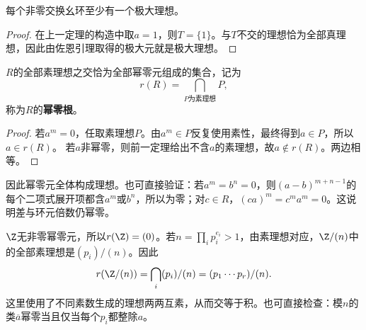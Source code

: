 \begin{corollary}
每个非零交换幺环至少有一个极大理想。
\end{corollary}
\begin{proof}
在上一定理的构造中取$a=1$，则$T=\{1\}$。与$T$不交的理想恰为全部真理想，因此由佐恩引理取得的极大元就是极大理想。
\end{proof}

\begin{corollary}
$R$的全部素理想之交恰为全部幂零元组成的集合，记为
\[
r(R)=\bigcap_{P\text{为素理想}}P,
\]
称为$R$的\textbf{幂零根}。
\end{corollary}
\begin{proof}
若$a^m=0$，任取素理想$P$。由$a^m\in P$反复使用素性，最终得到$a\in P$，所以$a\in r(R)$。
若$a$非幂零，则前一定理给出不含$a$的素理想，故$a\notin r(R)$。两边相等。
\end{proof}

因此幂零元全体构成理想。也可直接验证：若$a^m=b^n=0$，则$(a-b)^{m+n-1}$的每个二项式展开项都含$a^m$或$b^n$，所以为零；对$c\in R$，$(ca)^m=c^ma^m=0$。这说明差与环元倍数仍幂零。

\begin{example}
$\Z$无非零幂零元，所以$r(\Z)=(0)$。若$n=\prod_i p_i^{e_i}>1$，由素理想对应，$\Z/(n)$中的全部素理想是$(p_i)/(n)$。因此
\[
r(\Z/(n))=\bigcap_i(p_i)/(n)=(p_1\cdots p_r)/(n).
\]
这里使用了不同素数生成的理想两两互素，从而交等于积。也可直接检查：模$n$的类$\overline a$幂零当且仅当每个$p_i$都整除$a$。
\end{example}
